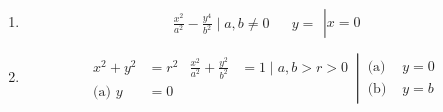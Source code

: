 \documentclass[12pt, A4]{report}
\begin{document}
\begin{enumerate}
\[\begin{aligned}
						\end{aligned}\,\right|\, x = 0
					\]
				\item
				\[
					\left.\begin{aligned}
						\frac{x^2}{a^2} - \frac{y^4}{b^2} \mid a, b \ne 0 &&
							y = 
					\end{aligned}\right| x = 0
				\]
				\item
					\[
						\left.\begin{aligned}
							x^2 + y^2 &= r^2 & 
								\frac{x^2}{a^2} + \frac{y^2}{b^2} &= 1 
								\mid a, b > r > 0\\
							\text{(a) } y &= 0
						\end{aligned}\,\right|\,
						\begin{aligned}
							\text{(a) } &y = 0 \\
							\text{(b) } &y = b
						\end{aligned}
					\]
			\end{enumerate}
			\newpage
\end{document}
